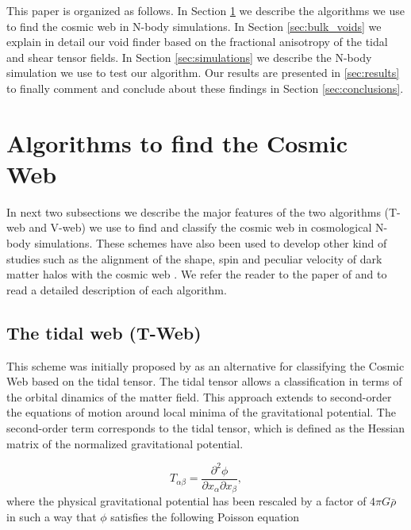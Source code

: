 \documentclass[a4,useAMS,usenatbib,usegraphicx]{mn2e}
\newcommand{\eq}[2]{\begin{equation} \label{eq:#1} #2 \end{equation}}
\begin{document}
This paper is organized as follows. 
In Section \ref{sec:algorithms_cosmic_web} we describe the algorithms
we use to find the cosmic web in N-body simulations. 
In Section \ref{sec:bulk_voids} we explain in detail our void finder
based on the fractional anisotropy of the tidal and shear tensor
fields. 
In Section  \ref{sec:simulations} we describe the N-body simulation we
use to test our algorithm. 
Our results are presented in \ref{sec:results} to finally comment and
conclude about these findings in Section \ref{sec:conclusions}. 


\section{Algorithms to find the Cosmic Web}
\label{sec:algorithms_cosmic_web}

In next two subsections we describe the major features of the two
algorithms (T-web and V-web) we use to find and classify the cosmic web in cosmological
N-body simulations. 
These schemes have also been used to develop other kind of studies
such as the alignment of the shape, spin and peculiar velocity of dark
matter halos with the cosmic web \citep{Libeskind13,Forero2014}.
We refer the reader to the paper of \cite{Forero09} and
\cite{Hoffman12} to read a detailed description of each algorithm. 


\subsection{The tidal web (T-Web)}
\label{subsec:Tweb}


This scheme was initially proposed by \citet{Hahn07} as an
alternative for classifying the Cosmic Web based on the tidal tensor.
The tidal tensor allows a classification in terms of the orbital
dinamics of the matter field.
This approach extends to second-order the equations of motion around 
local minima of the gravitational potential. 
The second-order term corresponds to the tidal tensor, which is
defined as the Hessian matrix of the normalized gravitational
potential.


\eq{V_web}
{	T_{\alpha\beta} = \frac{\partial^2\phi}{\partial x_{\alpha}\partial x_{\beta}},	}
where the physical gravitational potential has been rescaled by a
factor of   $4\pi G\bar{\rho}$ in such a way that $\phi$ satisfies the following 
Poisson equation
\end{document}
